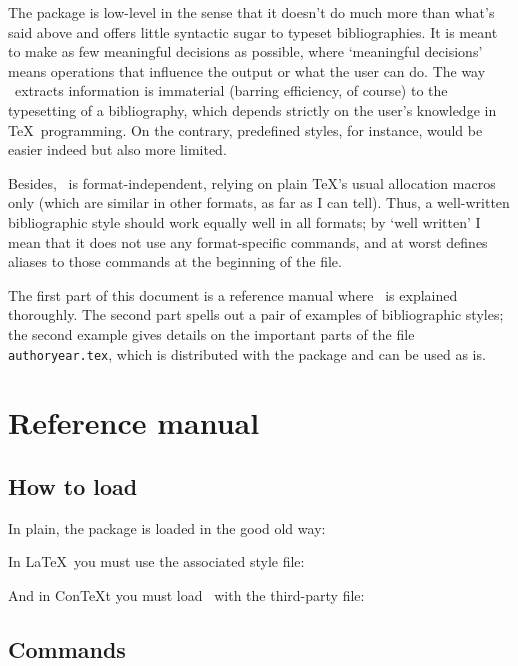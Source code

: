 The package is low-level in the sense that it doesn't do much more
than what's said above and offers little syntactic sugar to typeset
bibliographies. It is meant to make as few meaningful decisions as
possible, where `meaningful decisions' means operations that influence
the output or what the user can do. The way \lib\ extracts information
is immaterial (barring efficiency, of course) to the typesetting of
a bibliography, which depends strictly on the user's knowledge in
\TeX\ programming. On the contrary, predefined styles, for instance,
would be easier indeed but also more limited.

Besides, \lib\ is format-independent, relying on plain \TeX's usual
allocation macros only (which are similar in other formats, as far
as I can tell). Thus, a well-written bibliographic style should 
work equally well in all formats; by `well written' I mean that it does
not use any format-specific commands, and at worst defines aliases
to those commands at the beginning of the file.

The first part of this document is a reference manual where \lib\
is explained thoroughly. The second part spells out a pair of
examples of bibliographic styles; the second example gives details
on the important parts of the file \texttt{authoryear.tex}, which
is distributed with the package and can be used as is.





\section{Reference manual}

\subsection{How to load \lib}

In plain, the package is loaded in the good old way:

\verbatim

\endverbatim

\noindent In La\TeX\ you must use the associated style file:

\verbatim
\usepackage{librarian}
\endverbatim

\noindent And in Con\TeX t you must load \lib\ with the
third-party file:

\verbatim
\usemodule[librarian]
\endverbatim

\subsection{Commands}

